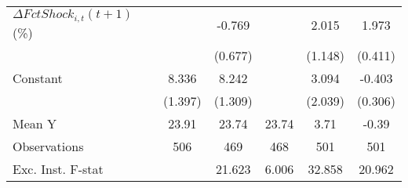{\begin{tabular}{l*{5}{c}}
\addlinespace
$ \Delta FctShock_{i,t}(t+1)$ (\%)&                     &      -0.769         &                     &       2.015\sym{*}  &       1.973\sym{***}\\
                    &                     &     (0.677)         &                     &     (1.148)         &     (0.411)         \\
\addlinespace
Constant            &       8.336\sym{***}&       8.242\sym{***}&                     &       3.094         &      -0.403         \\
                    &     (1.397)         &     (1.309)         &                     &     (2.039)         &     (0.306)         \\
\midrule
Mean Y              &       23.91         &       23.74         &       23.74         &        3.71         &       -0.39         \\
Observations        &         506         &         469         &         468         &         501         &         501         \\
Exc. Inst. F-stat   &                     &      21.623         &       6.006         &      32.858         &      20.962         \\
\bottomrule
\end{tabular}
}
